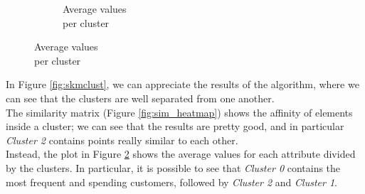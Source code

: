 \begin{figure}[h!]
\begin{subfigure}{0.32\textwidth}
	\caption{Average values\\ per cluster}
        \label{fig:km_avg}
    \end{subfigure}
\end{figure}

In Figure \ref{fig:skmclust}, we can appreciate the results of the algorithm, where we can see that the clusters are well separated from one another.\\
The similarity matrix (Figure \ref{fig:sim_heatmap}) shows the affinity of elements inside a cluster; we can see that the results are pretty good, and in particular \emph{Cluster 2} contains points really similar to each other.\\
Instead, the plot in Figure \ref{fig:km_avg} shows the average values for each attribute divided by the clusters. In particular, it is possible to see that \emph{Cluster 0} contains the most frequent and spending customers, followed by \emph{Cluster 2} and \emph{Cluster 1}.

